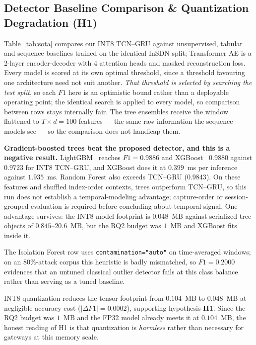 \documentclass[conference,a4paper]{IEEEtran}
\begin{document}
\subsection{Detector Baseline Comparison \& Quantization Degradation (H1)}
\label{sec:sota}
Table~\ref{tab:sota} compares our INT8 TCN--GRU against unsupervised, tabular and sequence baselines trained on the identical InSDN split; Transformer AE is a 2-layer encoder-decoder with 4 attention heads and masked reconstruction loss. Every model is scored at its own optimal threshold, since a threshold favouring one architecture need not suit another. \emph{That threshold is selected by searching the test split}, so each $F1$ here is an optimistic bound rather than a deployable operating point; the identical search is applied to every model, so comparison between rows stays internally fair. The tree ensembles receive the window flattened to $T \times d = 100$ features --- the same raw information the sequence models see --- so the comparison does not handicap them.

\textbf{Gradient-boosted trees beat the proposed detector, and this is a negative result.} LightGBM~\cite{b25} reaches $F1 = 0.9886$ and XGBoost~\cite{b26} $0.9880$ against $0.9723$ for INT8 TCN--GRU, and XGBoost does it at $0.399$~ms per inference against $1.935$~ms. Random Forest also exceeds TCN--GRU ($0.9843$). On these features and shuffled index-order contexts, trees outperform TCN--GRU, so this run does not establish a temporal-modeling advantage; capture-order or session-grouped evaluation is required before concluding about temporal signal. One advantage survives: the INT8 model footprint is $0.048$~MB against serialized tree objects of $0.845$--$20.6$~MB, but the RQ2 budget was $1$~MB and XGBoost fits inside it.

The Isolation Forest row uses \texttt{contamination="auto"} on time-averaged windows; on an $80\%$-attack corpus this heuristic is badly mismatched, so $F1 = 0.2000$ evidences that an untuned classical outlier detector fails at this class balance rather than serving as a tuned baseline.

INT8 quantization reduces the tensor footprint from $0.104$~MB to $0.048$~MB at negligible accuracy cost ($|\Delta F1| = 0.0002$), supporting hypothesis \textbf{H1}. Since the RQ2 budget was $1$~MB and the FP32 model already meets it at $0.104$~MB, the honest reading of H1 is that quantization is \emph{harmless} rather than necessary for gateways at this memory scale.
\end{document}
